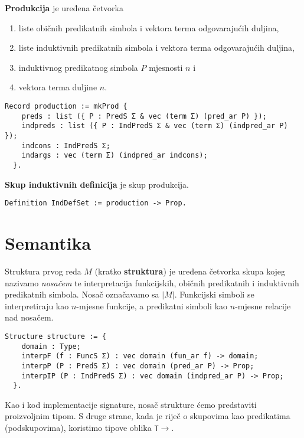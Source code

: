 \begin{definition}
  \textbf{Produkcija} je uređena četvorka
  \begin{enumerate}
  \item liste običnih predikatnih simbola i vektora terma odgovarajućih duljina,
  \item liste induktivnih predikatnih simbola i vektora terma odgovarajućih duljina,
  \item induktivnog predikatnog simbola \(P\) mjesnosti \(n\) i
  \item vektora terma duljine \(n\).
  \end{enumerate}
\begin{verbatim}
Record production := mkProd {
    preds : list ({ P : PredS Σ & vec (term Σ) (pred_ar P) });
    indpreds : list ({ P : IndPredS Σ & vec (term Σ) (indpred_ar P) });
    indcons : IndPredS Σ;
    indargs : vec (term Σ) (indpred_ar indcons);
  }.
\end{verbatim}
  \textbf{Skup induktivnih definicija} je skup produkcija.
\begin{verbatim}
Definition IndDefSet := production -> Prop.
\end{verbatim}
\end{definition}



\section{Semantika}\label{sec:semantika}
\begin{definition}
  Struktura prvog reda \(M\) (kratko \textbf{struktura}) je uređena četvorka
  skupa kojeg nazivamo \textit{nosačem} te interpretacija funkcijskih,
  običnih predikatnih i induktivnih predikatnih simbola.
  Nosač označavamo sa \(|M|\). Funkcijski simboli se interpretiraju kao \(n\)-mjesne funkcije, a predikatni simboli kao \(n\)-mjesne relacije nad nosačem.
\begin{verbatim}
Structure structure := {
    domain : Type;
    interpF (f : FuncS Σ) : vec domain (fun_ar f) -> domain;
    interpP (P : PredS Σ) : vec domain (pred_ar P) -> Prop;
    interpIP (P : IndPredS Σ) : vec domain (indpred_ar P) -> Prop;
  }.
\end{verbatim}
\end{definition}
\noindent Kao i kod implementacije signature, nosač strukture ćemo predstaviti proizvoljnim tipom.
S druge strane, kada je riječ o skupovima kao predikatima (podskupovima), koristimo tipove
oblika \texttt{T\(\rightarrow\)\coqprop{}}.


